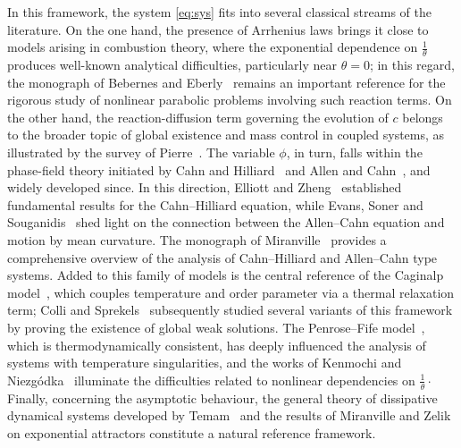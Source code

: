 \documentclass[final,1p,times]{elsarticle}
\numberwithin{equation}{section}
\begin{document}
	
	In this framework, the system \eqref{eq:sys} fits into several classical streams of the literature. On the one hand, the presence of Arrhenius laws brings it close to models arising in combustion theory, where the exponential dependence on $\tfrac{1}{\theta}$ produces well-known analytical difficulties, particularly near $\theta=0$; in this regard, the monograph of Bebernes and Eberly~\cite{BebernesEberly1989} remains an important reference for the rigorous study of nonlinear parabolic problems involving such reaction terms. On the other hand, the reaction-diffusion term governing the evolution of $c$ belongs to the broader topic of global existence and mass control in coupled systems, as illustrated by the survey of Pierre~\cite{PierreM2010}. The variable $\phi$, in turn, falls within the phase-field theory initiated by Cahn and Hilliard~\cite{CahnHilliard1958} and Allen and Cahn~\cite{AllenCahn1979}, and widely developed since. In this direction, Elliott and Zheng~\cite{ElliottZheng1986} established fundamental results for the Cahn--Hilliard equation, while Evans, Soner and Souganidis~\cite{EvansEtal1992} shed light on the connection between the Allen--Cahn equation and motion by mean curvature. The monograph of Miranville~\cite{MiranvilleBook2019} provides a comprehensive overview of the analysis of Cahn--Hilliard and Allen--Cahn type systems. Added to this family of models is the central reference of the Caginalp model~\cite{Caginalp1986}, which couples temperature and order parameter via a thermal relaxation term; Colli and Sprekels~\cite{ColliSprekels1995} subsequently studied several variants of this framework by proving the existence of global weak solutions. The Penrose--Fife model~\cite{PenroseFife1990}, which is thermodynamically consistent, has deeply influenced the analysis of systems with temperature singularities, and the works of Kenmochi and Niezg\'odka~\cite{KenmochiNiezgodka1994} illuminate the difficulties related to nonlinear dependencies on $\tfrac{1}{\theta}\cdotp$ Finally, concerning the asymptotic behaviour, the general theory of dissipative dynamical systems developed by Temam~\cite{TemamBook1997} and the results of Miranville and Zelik~\cite{MiranvilleZelik2004} on exponential attractors constitute a natural reference framework.
	
\end{document}
